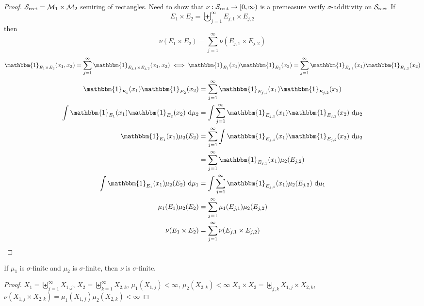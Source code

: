 \begin{proof}
  $\mathcal S_{\text{rect}} = \mathcal M_1 \times \mathcal M_2$ semiring of rectangles.
  Need to show that $\nu: \mathcal S_{\text{rect}} \to [0, \infty)$ is a premeasure
  verify $\sigma$-additivity on $\mathcal S_{\text{rect}}$ If 
  $$E_1 \times E_2 = \biguplus_{j=1}^\infty E_{j, 1} \times E_{j, 2}$$then
  $$\nu(E_1 \times E_2) = \sum_{j=1}^\infty \nu(E_{j, 1} \times E_{j, 2})$$
  \[\mathbbm{1}_{E_1 \times E_2}(x_1, x_2) = \sum_{j=1}^\infty \mathbbm{1}_{E_{j, 1} \times E_{j, 2}}(x_1, x_2)\iff \mathbbm{1}_{E_1}(x_1) \mathbbm{1}_{E_2}(x_2) = \sum_{j=1}^\infty \mathbbm{1}_{E_{j, 1}}(x_1) \mathbbm{1}_{E_{j, 2}}(x_2)\]
  \begin{align*}
    \mathbbm{1}_{E_1}(x_1) \mathbbm{1}_{E_2}(x_2) &= \sum_{j=1}^\infty \mathbbm{1}_{E_{j, 1}}(x_1) \mathbbm{1}_{E_{j, 2}}(x_2) \\
    \int \mathbbm{1}_{E_1}(x_1) \mathbbm{1}_{E_2}(x_2)\ \mathrm{d}\mu_2 &= \int \sum_{j=1}^\infty \mathbbm{1}_{E_{j, 1}}(x_1) \mathbbm{1}_{E_{j, 2}}(x_2) \ \mathrm{d}\mu_2\\
    \mathbbm{1}_{E_1}(x_1)\mu_2(E_2) &= \sum_{j=1}^\infty\int \mathbbm{1}_{E_{j, 1}}(x_1) \mathbbm{1}_{E_{j, 2}}(x_2) \ \mathrm{d}\mu_2\\
    &= \sum_{j=1}^\infty \mathbbm{1}_{E_{j, 1}}(x_1) \mu_2(E_{j, 2}) \\
    \int \mathbbm{1}_{E_1}(x_1)\mu_2(E_2) \ \mathrm{d}\mu_1 &= \int \sum_{j=1}^\infty \mathbbm{1}_{E_{j, 1}}(x_1) \mu_2(E_{j, 2}) \ \mathrm{d}\mu_1\\
    \mu_1(E_1)\mu_2(E_2) &= \sum_{j=1}^\infty \mu_1(E_{j, 1})\mu_2(E_{j, 2}) \\
    \nu(E_1 \times E_2) &= \sum_{j=1}^\infty \nu(E_{j, 1} \times E_{j, 2})
  \end{align*}
\end{proof}

\begin{lemma}
  If $\mu_1$ is $\sigma$-finite and $\mu_2$ is $\sigma$-finite, then $\nu$ is $\sigma$-finite.
\end{lemma}
\begin{proof}
  $X_1 = \biguplus_{j=1}^\infty X_{1, j}$, $X_2 = \biguplus_{k=1}^\infty X_{2, k}$, $\mu_1(X_{1, j}) < \infty$, $\mu_2(X_{2, k}) < \infty$
  $X_1 \times X_2 = \biguplus_{j, k} X_{1, j} \times X_{2, k}$, $\nu(X_{1, j} \times X_{2, k}) = \mu_1(X_{1, j})\mu_2(X_{2, k}) < \infty$
\end{proof}

